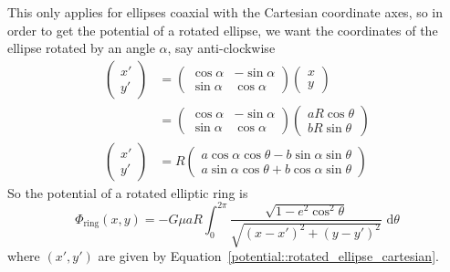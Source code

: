 This only applies for ellipses coaxial with the Cartesian coordinate axes, so in order to get the potential of a rotated ellipse,
we want the coordinates of the ellipse rotated by an angle \( \alpha \), say anti-clockwise
\begin{align}
    \begin{pmatrix}
        x' \\ y'
    \end{pmatrix} & = \begin{pmatrix}
                          \cos{\alpha} & -\sin{\alpha} \\
                          \sin{\alpha} & \cos{\alpha}
                      \end{pmatrix} \begin{pmatrix}
                                        x \\ y
                                    \end{pmatrix}                              \\
                    & = \begin{pmatrix}
                            \cos{\alpha} & -\sin{\alpha} \\
                            \sin{\alpha} & \cos{\alpha}
                        \end{pmatrix} \begin{pmatrix}
                                          aR\cos{\theta} \\ bR\sin{\theta}
                                      \end{pmatrix} \nonumber             \\
    \begin{pmatrix}
        x' \\ y'
    \end{pmatrix} & = R\begin{pmatrix}
                           a\cos{\alpha}\cos{\theta} - b\sin{\alpha}\sin{\theta} \\
                           a\sin{\alpha}\cos{\theta} + b\cos{\alpha}\sin{\theta}
                       \end{pmatrix} \label{potential::rotated_ellipse_cartesian}
\end{align}
So the potential of a rotated elliptic ring is
\begin{equation}
    \Phi_{\text{ring}}(x, y) = -G \mu a R \int_{0}^{2\pi} \frac{\sqrt{1 - e^2\cos^2{\theta}}}{\sqrt{{(x - x')}^{2} + {(y - y')}^{2}}} \,\,{} \mathrm{d}\theta
\end{equation}
where \( (x', y') \) are given by Equation~\ref{potential::rotated_ellipse_cartesian}.